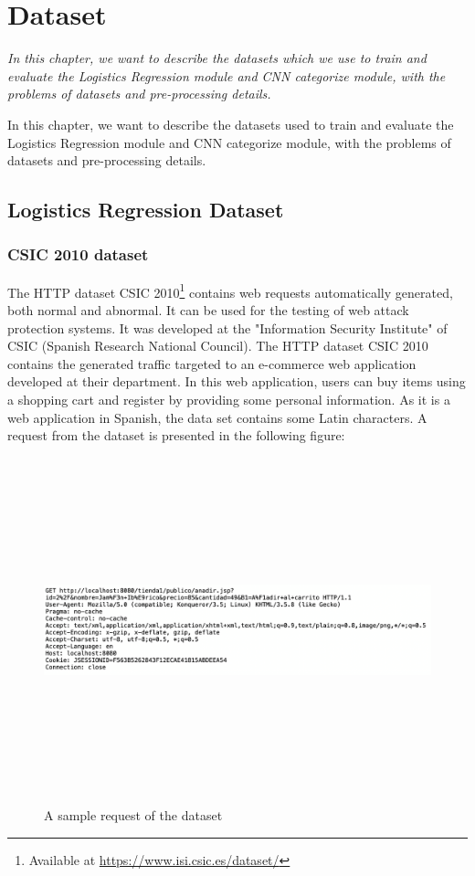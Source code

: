 \chapter{Dataset}
\label{chap:dataset}
	\textit{In this chapter, we want to describe the datasets which we use to train and evaluate the Logistics Regression module and CNN categorize module, with the problems of datasets and pre-processing details.}
\minitoc

In this chapter, we want to describe the datasets used to train and evaluate the Logistics Regression module and CNN categorize module, with the problems of datasets and pre-processing details. 
\section{Logistics Regression Dataset}
\label{sec:logistic_dataset}
\subsection{CSIC 2010 dataset}
The HTTP dataset CSIC 2010\footnote{Available at \url{https://www.isi.csic.es/dataset/}} contains web requests automatically generated, both normal and abnormal. It can be used for the testing of web attack protection systems. It was developed at the "Information Security Institute" of CSIC (Spanish Research National Council). The HTTP dataset CSIC 2010 contains the generated traffic targeted to an e-commerce web application developed at their department. In this web application, users can buy items using a shopping cart and register by providing some personal information. As it is a web application in Spanish, the data set contains some Latin characters. A request from the dataset is presented in the following figure:

\begin{figure}[!h]
	\centering
	\includegraphics[width=\linewidth, height=10cm,keepaspectratio]{figures/dataset1.png}
  \caption{A sample request of the dataset}
\end{figure} 

